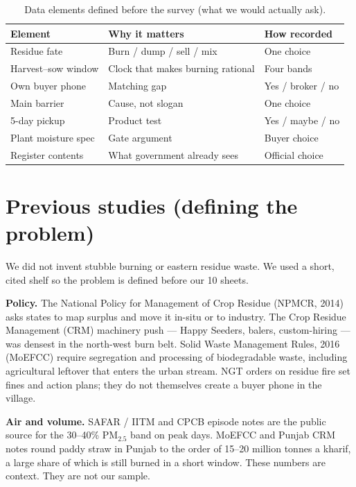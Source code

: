 \documentclass[12pt,a4paper]{article}
\begin{document}
\begin{table}[h]
\centering
\caption{Data elements defined before the survey (what we would actually ask).}
\label{tab:element}
\small
\begin{tabularx}{\textwidth}{@{}lXl@{}}
\toprule
\textbf{Element} & \textbf{Why it matters} & \textbf{How recorded} \\
\midrule
Residue fate & Burn / dump / sell / mix & One choice \\
Harvest--sow window & Clock that makes burning rational & Four bands \\
Own buyer phone & Matching gap & Yes / broker / no \\
Main barrier & Cause, not slogan & One choice \\
5-day pickup & Product test & Yes / maybe / no \\
Plant moisture spec & Gate argument & Buyer choice \\
Register contents & What government already sees & Official choice \\
\bottomrule
\end{tabularx}
\end{table}

\section{Previous studies (defining the problem)}
We did not invent stubble burning or eastern residue waste. We used a short, cited shelf so the problem is defined before our 10 sheets.

\textbf{Policy.} The National Policy for Management of Crop Residue (NPMCR, 2014) asks states to map surplus and move it in-situ or to industry. The Crop Residue Management (CRM) machinery push --- Happy Seeders, balers, custom-hiring --- was densest in the north-west burn belt. Solid Waste Management Rules, 2016 (MoEFCC) require segregation and processing of biodegradable waste, including agricultural leftover that enters the urban stream. NGT orders on residue fire set fines and action plans; they do not themselves create a buyer phone in the village.

\textbf{Air and volume.} SAFAR / IITM and CPCB episode notes are the public source for the 30--40\% PM$_{2.5}$ band on peak days. MoEFCC and Punjab CRM notes round paddy straw in Punjab to the order of 15--20 million tonnes a kharif, a large share of which is still burned in a short window. These numbers are context. They are not our sample.
\end{document}
